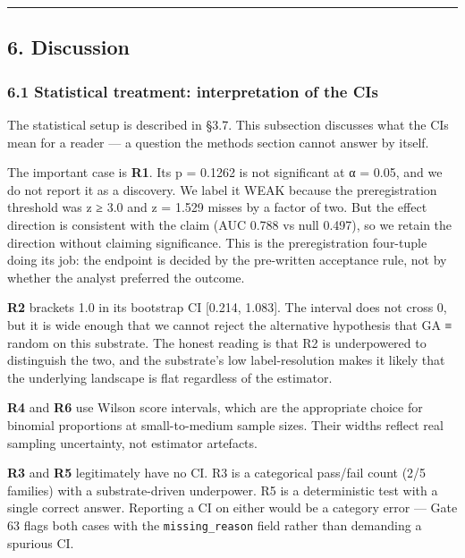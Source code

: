 \documentclass[
]{article}
\begin{document}
\begin{center}\rule{0.5\linewidth}{0.5pt}\end{center}

\subsection{6. Discussion}\label{discussion}

\subsubsection{6.1 Statistical treatment: interpretation of the
CIs}\label{statistical-treatment-interpretation-of-the-cis}

The statistical setup is described in §3.7. This subsection discusses
what the CIs mean for a reader --- a question the methods section cannot
answer by itself.

The important case is \textbf{R1}. Its p = 0.1262 is not significant at
α = 0.05, and we do not report it as a discovery. We label it WEAK
because the preregistration threshold was z ≥ 3.0 and z = 1.529 misses
by a factor of two. But the effect direction is consistent with the
claim (AUC 0.788 vs null 0.497), so we retain the direction without
claiming significance. This is the preregistration four-tuple doing its
job: the endpoint is decided by the pre-written acceptance rule, not by
whether the analyst preferred the outcome.

\textbf{R2} brackets 1.0 in its bootstrap CI {[}0.214, 1.083{]}. The
interval does not cross 0, but it is wide enough that we cannot reject
the alternative hypothesis that GA ≡ random on this substrate. The
honest reading is that R2 is underpowered to distinguish the two, and
the substrate's low label-resolution makes it likely that the underlying
landscape is flat regardless of the estimator.

\textbf{R4} and \textbf{R6} use Wilson score intervals, which are the
appropriate choice for binomial proportions at small-to-medium sample
sizes. Their widths reflect real sampling uncertainty, not estimator
artefacts.

\textbf{R3} and \textbf{R5} legitimately have no CI. R3 is a categorical
pass/fail count (2/5 families) with a substrate-driven underpower. R5 is
a deterministic test with a single correct answer. Reporting a CI on
either would be a category error --- Gate 63 flags both cases with the
\texttt{missing\_reason} field rather than demanding a spurious CI.
\end{document}
